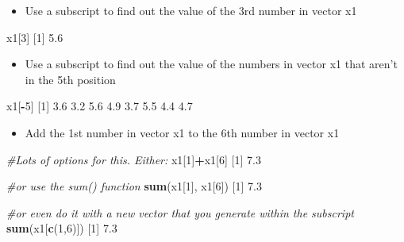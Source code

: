 \documentclass[
]{book}
\newenvironment{Shaded}{\begin{snugshade}}{\end{snugshade}}
\newcommand{\CommentTok}[1]{\textcolor[rgb]{0.56,0.35,0.01}{\textit{#1}}}
\newcommand{\DecValTok}[1]{\textcolor[rgb]{0.00,0.00,0.81}{#1}}
\newcommand{\FloatTok}[1]{\textcolor[rgb]{0.00,0.00,0.81}{#1}}
\newcommand{\KeywordTok}[1]{\textcolor[rgb]{0.13,0.29,0.53}{\textbf{#1}}}
\newcommand{\NormalTok}[1]{#1}
\newcommand{\OperatorTok}[1]{\textcolor[rgb]{0.81,0.36,0.00}{\textbf{#1}}}
\providecommand{\tightlist}{%
  \setlength{\itemsep}{0pt}\setlength{\parskip}{0pt}}
\begin{document}
\begin{itemize}
\tightlist
\item
  Use a subscript to find out the value of the 3rd number in vector x1
\end{itemize}

\begin{Shaded}
\begin{Highlighting}[]
\NormalTok{x1[}\DecValTok{3}\NormalTok{]}
\NormalTok{[}\DecValTok{1}\NormalTok{] }\FloatTok{5.6}
\end{Highlighting}
\end{Shaded}

\begin{itemize}
\tightlist
\item
  Use a subscript to find out the value of the numbers in vector x1 that aren't in the 5th position
\end{itemize}

\begin{Shaded}
\begin{Highlighting}[]
\NormalTok{x1[}\OperatorTok{-}\DecValTok{5}\NormalTok{]}
\NormalTok{[}\DecValTok{1}\NormalTok{] }\FloatTok{3.6} \FloatTok{3.2} \FloatTok{5.6} \FloatTok{4.9} \FloatTok{3.7} \FloatTok{5.5} \FloatTok{4.4} \FloatTok{4.7}
\end{Highlighting}
\end{Shaded}

\begin{itemize}
\tightlist
\item
  Add the 1st number in vector x1 to the 6th number in vector x1
\end{itemize}

\begin{Shaded}
\begin{Highlighting}[]
\CommentTok{#Lots of options for this. Either:}
\NormalTok{x1[}\DecValTok{1}\NormalTok{]}\OperatorTok{+}\NormalTok{x1[}\DecValTok{6}\NormalTok{]}
\NormalTok{[}\DecValTok{1}\NormalTok{] }\FloatTok{7.3}

\CommentTok{#or use the sum() function}
\KeywordTok{sum}\NormalTok{(x1[}\DecValTok{1}\NormalTok{], x1[}\DecValTok{6}\NormalTok{])}
\NormalTok{[}\DecValTok{1}\NormalTok{] }\FloatTok{7.3}

\CommentTok{#or even do it with a new vector that you generate within the subscript}
\KeywordTok{sum}\NormalTok{(x1[}\KeywordTok{c}\NormalTok{(}\DecValTok{1}\NormalTok{,}\DecValTok{6}\NormalTok{)])}
\NormalTok{[}\DecValTok{1}\NormalTok{] }\FloatTok{7.3}
\end{Highlighting}
\end{Shaded}
\end{document}
